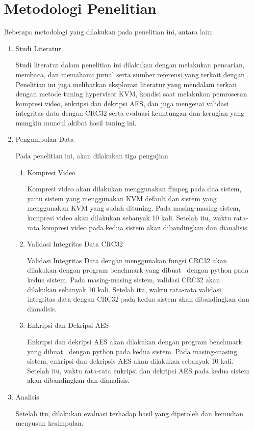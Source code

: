 \section{Metodologi Penelitian}
Beberapa metodologi yang dilakukan pada penelitian ini, antara lain:
\begin{enumerate}
      \item Studi Literatur

            Studi literatur dalam penelitian ini dilakukan dengan melakukan pencarian, membaca, dan memahami jurnal serta sumber referensi yang terkait dengan \cc. Penelitian ini juga melibatkan eksplorasi literatur yang mendalam terkait dengan metode tuning hypervisor KVM, kondisi saat melakukan pemrosesan kompresi video, enkripsi dan dekripsi AES, dan juga mengenai validasi integritas data dengan CRC32 serta evaluasi keuntungan dan kerugian yang mungkin muncul akibat hasil tuning ini.

      \item Pengumpulan Data

            Pada penelitian ini, akan dilakukan tiga pengujian
            \begin{enumerate}
                  \item Kompresi Video

                        Kompresi video akan dilakukan menggunakan ffmpeg pada dua sistem, yaitu sistem yang menggunakan KVM default dan sistem yang menggunakan KVM yang sudah dituning. Pada masing-masing sistem, kompresi video akan dilakukan sebanyak 10 kali. Setelah itu, waktu rata-rata kompresi video pada kedua sistem akan dibandingkan dan dianalisis.

                  \item Validasi Integritas Data CRC32

                        Validasi Integritas Data dengan menggunakan fungsi CRC32 akan dilakukan dengan program benchmark yang dibuat \saya\ dengan python pada kedua sistem. Pada masing-masing sistem, validasi CRC32 akan dilakukan sebanyak 10 kali. Setelah itu, waktu rata-rata validasi integritas data dengan CRC32 pada kedua sistem akan dibandingkan dan dianalisis.

                  \item Enkripsi dan Dekripsi AES

                        Enkripsi dan dekripsi AES akan dilakukan dengan program benchmark yang dibuat \saya\ dengan python pada kedua sistem. Pada masing-masing sistem, enkripsi dan dekripsis AES akan dilakukan sebanyak 10 kali. Setelah itu, waktu rata-rata enkripsi dan dekripsi AES pada kedua sistem akan dibandingkan dan dianalisis.
            \end{enumerate}

      \item Analisis

            Setelah itu, dilakukan evaluasi terhadap hasil yang diperoleh dan kemudian menyusun kesimpulan.
\end{enumerate}


